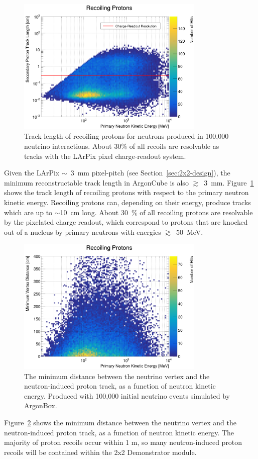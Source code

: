 \begin{figure}[htbp]
  \centering
  \includegraphics[width=0.8\textwidth]{plots/proton_track_length.png}
  \caption{Track length of recoiling protons for neutrons produced in 100,000 neutrino interactions. About 30\% of all recoils are resolvable as tracks with the LArPix pixel charge-readout system.}
  \label{fig:proton_length}
\end{figure}
Given the LArPix $\sim$~3~mm pixel-pitch (see Section~\ref{sec:2x2-design}), the minimum reconstructable track length in ArgonCube is also $\gtrsim$~3~mm. Figure~\ref{fig:proton_length} shows the track length of recoiling protons with respect to the primary neutron kinetic energy. Recoiling protons can, depending on their energy, produce tracks which are up to $\sim$10~cm long. About 30~\% of all recoiling protons are resolvable by the pixelated charge readout, which correspond to protons that are knocked out of a nucleus by primary neutrons with energies $\gtrsim$~50~MeV.

\begin{figure}[htbp]
  \centering
  \includegraphics[width=0.8\textwidth]{plots/min_dist_vtx_proton_recoil.png}
  \caption{The minimum distance between the neutrino vertex and the neutron-induced proton track, as a function of neutron kinetic energy. Produced with 100,000 initial neutrino events simulated by ArgonBox.}
  \label{fig:min_dist_proton}
\end{figure}
Figure~\ref{fig:min_dist_proton} shows the minimum distance between the neutrino vertex and the neutron-induced proton track, as a function of neutron kinetic energy. The majority of proton recoils occur within 1 m, so many neutron-induced proton recoils will be contained within the 2x2 Demonstrator module.

